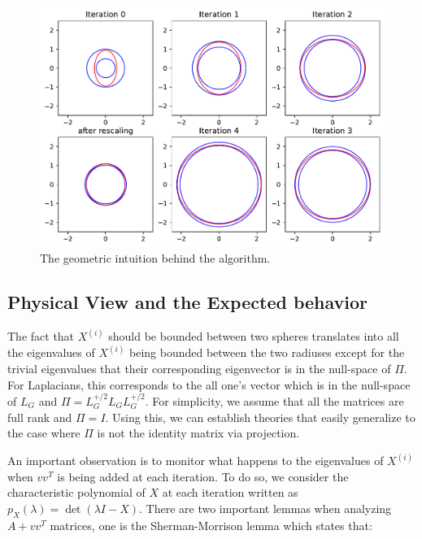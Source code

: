 \documentclass[
  letterpaper,
  DIV=11,
  numbers=noendperiod]{scrartcl}
\theoremstyle{plain}
\theoremstyle{plain}
\theoremstyle{plain}
\theoremstyle{definition}
\theoremstyle{plain}
\theoremstyle{remark}
\begin{document}
\begin{figure}[H]

{\centering \includegraphics{index_files/figure-pdf/fig-ellipsoid-output-1.pdf}

}

\caption{\label{fig-ellipsoid}The geometric intuition behind the
algorithm.}

\end{figure}

\hypertarget{physical-view-and-the-expected-behavior}{%
\subsection{Physical View and the Expected
behavior}\label{physical-view-and-the-expected-behavior}}

The fact that \(X^{(i)}\) should be bounded between two spheres
translates into all the eigenvalues of \(X^{(i)}\) being bounded between
the two radiuses except for the trivial eigenvalues that their
corresponding eigenvector is in the null-space of \(\Pi\). For
Laplacians, this corresponds to the all one's vector which is in the
null-space of \(L_G\) and \(\Pi = L_G^{+/2} L_G L_G^{+/2}\). For
simplicity, we assume that all the matrices are full rank and
\(\Pi = I\). Using this, we can establish theories that easily
generalize to the case where \(\Pi\) is not the identity matrix via
projection.

An important observation is to monitor what happens to the eigenvalues
of \(X^{(i)}\) when \(vv^T\) is being added at each iteration. To do so,
we consider the characteristic polynomial of \(X\) at each iteration
written as \(p_X(\lambda) = \det(\lambda I - X)\). There are two
important lemmas when analyzing \(A + vv^T\) matrices, one is the
Sherman-Morrison lemma which states that:
\end{document}
